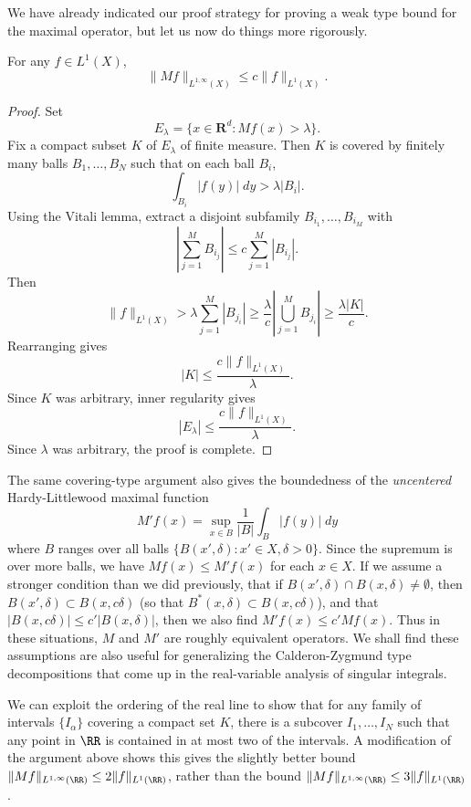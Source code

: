 We have already indicated our proof strategy for proving a weak type bound for the maximal operator, but let us now do things more rigorously.

\begin{theorem}
  For any $f \in L^1(X)$,
  \[ \| Mf \|_{L^{1,\infty}(X)} \leq c \| f \|_{L^1(X)}. \]
\end{theorem}
\begin{proof}
  Set
  \[ E_\lambda = \{ x \in \mathbf{R}^d: Mf(x) > \lambda \}. \]
  Fix a compact subset $K$ of $E_\lambda$ of finite measure. Then $K$ is covered by finitely many balls $B_1,\dots,B_N$ such that on each ball $B_i$,
  \[ \int_{B_i} |f(y)|\; dy > \lambda |B_i|. \]
  Using the Vitali lemma, extract a disjoint subfamily $B_{i_1},\dots, B_{i_M}$ with
  \[ \left| \sum_{j = 1}^M B_{i_j} \right| \leq c \sum_{j = 1}^M |B_{i_j}|. \]
  Then
  \[ \| f \|_{L^1(X)} > \lambda \sum_{j = 1}^M |B_{j_i}| \geq \frac{\lambda}{c} \left| \bigcup_{j = 1}^M B_{j_i} \right| \geq \frac{\lambda |K|}{c}. \]
  Rearranging gives
  \[ |K| \leq \frac{c \| f \|_{L^1(X)}}{\lambda}. \]
  Since $K$ was arbitrary, inner regularity gives
  \[ |E_\lambda| \leq \frac{c \| f \|_{L^1(X)}}{\lambda}. \]
  Since $\lambda$ was arbitrary, the proof is complete.
\end{proof}

\begin{remark}
  The same covering-type argument also gives the boundedness of the \emph{uncentered} Hardy-Littlewood maximal function
  \[ M'f(x) = \sup_{x \in B} \frac{1}{|B|} \int_B |f(y)|\; dy \]
  where $B$ ranges over all balls $\{ B(x',\delta) : x' \in X, \delta > 0 \}$. Since the supremum is over more balls, we have $Mf(x) \leq M'f(x)$ for each $x \in X$. If we assume a stronger condition than we did previously, that if $B(x',\delta) \cap B(x,\delta) \neq \emptyset$, then $B(x',\delta) \subset B(x,c\delta)$ (so that $B^*(x,\delta) \subset B(x,c\delta)$), and that $|B(x,c\delta)| \leq c' |B(x,\delta)|$, then we also find $M' f(x) \leq c' Mf(x)$. Thus in these situations, $M$ and $M'$ are roughly equivalent operators. We shall find these assumptions are also useful for generalizing the Calderon-Zygmund type decompositions that come up in the real-variable analysis of singular integrals.
\end{remark}

\begin{remark}
  We can exploit the ordering of the real line to show that for any family of intervals $\{ I_\alpha \}$ covering a compact set $K$, there is a subcover $I_1,\dots, I_N$ such that any point in $\RR$ is contained in at most two of the intervals. A modification of the argument above shows this gives the slightly better bound $\| Mf \|_{L^{1,\infty}(\RR)} \leq 2 \| f \|_{L^1(\RR)}$, rather than the bound $\| Mf \|_{L^{1,\infty}(\RR)} \leq 3 \| f \|_{L^1(\RR)}$.
\end{remark}






